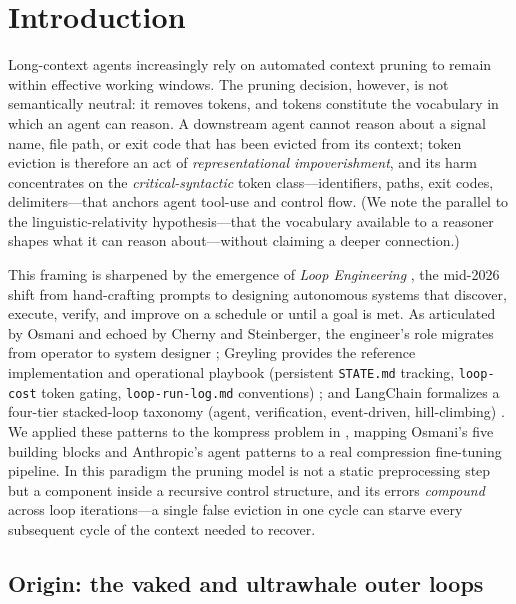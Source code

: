 \section{Introduction}
\label{sec:introduction}

Long-context agents increasingly rely on automated context pruning to remain
within effective working windows. The pruning decision, however, is not
semantically neutral: it removes tokens, and tokens constitute the vocabulary
in which an agent can reason. A downstream agent cannot
reason about a signal name, file path, or exit code that has been evicted from
its context; token eviction is therefore an act of \emph{representational
impoverishment}, and its harm concentrates on the \emph{critical-syntactic}
token class---identifiers, paths, exit codes, delimiters---that anchors agent
tool-use and control flow. (We note the parallel to the linguistic-relativity
hypothesis---that the vocabulary available to a reasoner shapes what it can
reason about---without claiming a deeper connection.)

This framing is sharpened by the emergence of \emph{Loop Engineering}
\citep{osmani2026loop}, the mid-2026 shift from hand-crafting prompts to
designing autonomous systems that discover, execute, verify, and improve on a
schedule or until a goal is met. As articulated by Osmani and echoed by
Cherny and Steinberger, the engineer's role migrates from operator to system
designer \citep{osmani2026oreilly}; Greyling provides the reference
implementation and operational playbook (persistent \texttt{STATE.md}
tracking, \texttt{loop-cost} token gating, \texttt{loop-run-log.md}
conventions) \citep{greyling2026loop}; and LangChain formalizes a four-tier
stacked-loop taxonomy (agent, verification, event-driven, hill-climbing)
\citep{langchain2026loops}. We applied these patterns to the kompress problem
in \citet{lodri2026loopapplied}, mapping Osmani's five building blocks and
Anthropic's agent patterns to a real compression fine-tuning pipeline. In this
paradigm the pruning model is not a static
preprocessing step but a component inside a recursive control structure, and
its errors \emph{compound} across loop iterations---a single false eviction in
one cycle can starve every subsequent cycle of the context needed to recover.

\subsection{Origin: the vaked and ultrawhale outer loops}

